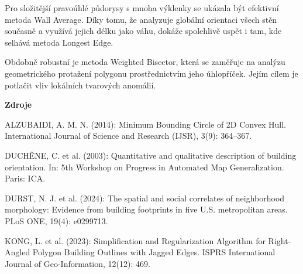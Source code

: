 \documentclass[12pt]{article}
\begin{document}
Pro složitější pravoúhlé půdorysy s mnoha výklenky se ukázala být efektivní metoda Wall Average. Díky tomu, že analyzuje globální orientaci všech stěn současně a využívá jejich délku jako váhu, dokáže spolehlivě uspět i tam, kde selhává metoda Longest Edge.

Obdobně robustní je metoda Weighted Bisector, která se zaměřuje na analýzu geometrického protažení polygonu prostřednictvím jeho úhlopříček. Jejím cílem je potlačit vliv lokálních tvarových anomálií.

\newpage
\textbf{Zdroje}

ALZUBAIDI, A. M. N. (2014): Minimum Bounding Circle of 2D Convex Hull. International Journal of Science and Research (IJSR), 3(9): 364–367.

DUCHÊNE, C. et al. (2003): Quantitative and qualitative description of building orientation. In: 5th Workshop on Progress in Automated Map Generalization. Paris: ICA.

DURST, N. J. et al. (2024): The spatial and social correlates of neighborhood morphology: Evidence from building footprints in five U.S. metropolitan areas. PLoS ONE, 19(4): e0299713.

KONG, L. et al. (2023): Simplification and Regularization Algorithm for Right-Angled Polygon Building Outlines with Jagged Edges. ISPRS International Journal of Geo-Information, 12(12): 469.
\end{document}
